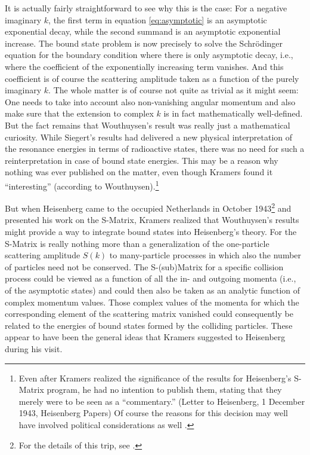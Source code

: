\documentclass[12pt]{article}
\begin{document}
It is actually fairly straightforward to see why this is the case: For a negative imaginary $k$, the first term in equation \ref{eq:asymptotic} is an asymptotic exponential decay, while the second summand is an asymptotic exponential increase. The bound state problem is now precisely to solve the Schr\"{o}dinger equation for the boundary condition where there is only asymptotic decay, i.e., where the coefficient of the exponentially increasing term vanishes. And this coefficient is of course the scattering amplitude taken as a function of the purely imaginary $k$. The whole matter is of course not quite as trivial as it might seem: One needs to take into account also non-vanishing angular momentum and also make sure that the extension to complex $k$ is in fact mathematically well-defined. But the fact remains that Wouthuysen's result was really just a mathematical curiosity. While Siegert's results had delivered a new physical interpretation of the resonance energies in terms of radioactive states, there was no need for such a reinterpretation in case of bound state energies. This may be a reason why nothing was ever published on the matter, even though Kramers found it ``interesting'' (according to Wouthuysen).\footnote{Even after Kramers realized the significance of the results for Heisenberg's S-Matrix program, he had no intention to publish them, stating that they merely were to be seen as a ``commentary.'' (Letter to Heisenberg, 1 December 1943, Heisenberg Papers) Of course the reasons for this decision may well have involved political considerations as well \citep[p. 458]{dresden_1987_h}.}

But when Heisenberg came to the occupied Netherlands in October 1943\footnote{For the details of this trip, see \citep{rechenberg_1989_the-early}.} and presented his work on the S-Matrix, Kramers realized that Wouthuysen's results might provide a way to integrate bound states into Heisenberg's theory. For the S-Matrix is really nothing more than a generalization of the one-particle scattering amplitude $S(k)$ to many-particle processes in which also the number of particles need not be conserved. The S-(sub)Matrix for a specific collision process could be viewed as a function of all the in- and outgoing momenta (i.e., of the asymptotic states) and could then also be taken as an analytic function of complex momentum values. Those complex values of the momenta for which the corresponding element of the scattering matrix vanished could consequently be related to the energies of bound states formed by the colliding particles. These appear to have been the general ideas that Kramers suggested to Heisenberg during his visit.
\end{document}
